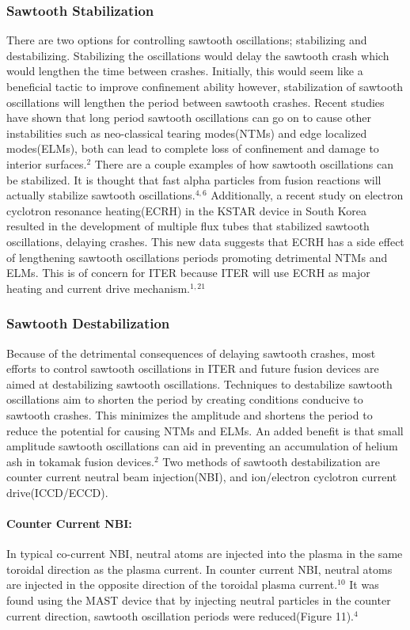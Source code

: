 \documentclass{article}
\begin{document}
\subsubsection{Sawtooth Stabilization}
There are two options for controlling sawtooth oscillations; stabilizing and destabilizing.  Stabilizing the oscillations would delay the sawtooth crash which would lengthen the time between crashes.  Initially, this would seem like a beneficial tactic to improve confinement ability however, stabilization of sawtooth oscillations will lengthen the period between sawtooth crashes.  Recent studies have shown that long period sawtooth oscillations can go on to cause other instabilities such as neo-classical tearing modes(NTMs) and edge localized modes(ELMs), both can lead to complete loss of confinement and damage to interior surfaces.$^{2}$  There are a couple examples of how sawtooth oscillations can be stabilized.  It is thought that fast alpha particles from fusion reactions will actually stabilize sawtooth oscillations.$^{4,6}$   Additionally, a recent study on electron cyclotron resonance heating(ECRH) in the KSTAR device in South Korea resulted in the development of multiple flux tubes that stabilized sawtooth oscillations, delaying crashes.  This new data suggests that ECRH has a side effect of lengthening sawtooth oscillations periods promoting detrimental NTMs and ELMs.  This is of concern for ITER because ITER will use ECRH as major heating and current drive mechanism.$^{1,21}$
\subsubsection{Sawtooth Destabilization}
Because of the detrimental consequences of delaying sawtooth crashes, most efforts to control sawtooth oscillations in ITER and future fusion devices are aimed at destabilizing sawtooth oscillations.  Techniques to destabilize sawtooth oscillations aim to shorten the period by creating conditions conducive to sawtooth crashes.  This minimizes the amplitude and shortens the period to reduce the potential for causing NTMs and ELMs.  An added benefit is that small amplitude sawtooth oscillations can aid in preventing an accumulation of helium ash in tokamak fusion devices.$^{2}$  Two methods of sawtooth destabilization are counter current neutral beam injection(NBI), and ion/electron cyclotron current drive(ICCD/ECCD).
\paragraph{Counter Current NBI:}
In typical co-current NBI, neutral atoms are injected into the plasma in the same toroidal direction as the plasma current.  In counter current NBI, neutral atoms are injected in the opposite direction of the toroidal plasma current.$^{10}$  It was found using the MAST device that by injecting neutral particles in the counter current direction, sawtooth oscillation periods were reduced(Figure 11).$^{4}$
\newpage
\end{document}
